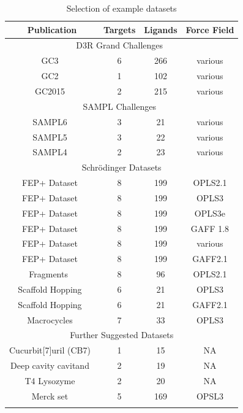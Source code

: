 \documentclass[9pt,bestpractices,pubversion]{livecoms}
\begin{document}
\begin{table}
\caption{Selection of example datasets}
\begin{tabular}{cccc}
\textbf{Publication} & \textbf{Targets} & \textbf{Ligands} & \textbf{Force Field} \\
\hline
\multicolumn{4}{|c|}{D3R Grand Challenges~\cite{D3R}} \\
\hline
GC3~\cite{gaieb2019d3r} & 6 & 266 & various \\
GC2~\cite{gaieb2018d3r} & 1 & 102 & various \\
GC2015~\cite{gathiaka2016d3r} & 2 & 215 & various \\
\hline
\multicolumn{4}{|c|}{SAMPL Challenges~\cite{SAMPL}} \\
\hline
SAMPL6~\cite{rizzi2018overview} & 3 & 21 & various \\
SAMPL5~\cite{yin2017overview} & 3 & 22 & various \\
SAMPL4~\cite{muddana2014sampl4} & 2 & 23 & various \\
\hline
\multicolumn{4}{|c|}{Schrödinger Datasets} \\
\hline
FEP+ Dataset~\cite{wang2015accurate} & 8 & 199 & OPLS2.1 \\
FEP+ Dataset~\cite{harder2016opls3} & 8 & 199 & OPLS3 \\
FEP+ Dataset~\cite{roos2019opls3e} & 8 & 199 & OPLS3e \\
FEP+ Dataset~\cite{song2019using} & 8 & 199 & GAFF 1.8 \\
FEP+ Dataset~\cite{gapsys2020large} & 8 & 199 & various \\
FEP+ Dataset~\cite{kuhn2020assessment} & 8 & 199 & GAFF2.1 \\
Fragments ~\cite{steinbrecher2015accurate} & 8 & 96 & OPLS2.1 \\
Scaffold Hopping~\cite{wang2017accurate} & 6 & 21 & OPLS3 \\
Scaffold Hopping~\cite{kuhn2020assessment} & 6 & 21 & GAFF2.1 \\
Macrocycles~\cite{yu2017accurate} & 7 & 33 & OPLS3 \\
\hline
\multicolumn{4}{|c|}{Further Suggested Datasets} \\
\hline
Cucurbit[7]uril (CB7)~\cite{mobley2017predicting} & 1 & 15 & NA \\
Deep cavity cavitand~\cite{mobley2017predicting} & 2 & 19 & NA \\
T4 Lysozyme~\cite{mobley2017predicting} & 2 & 20 & NA \\
Merck set~\cite{MCompChem2019Sep} & 5 & 169 & OPSL3 \\

\hline
\label{tab:benchmarks}
\end{tabular}
\end{table}
\end{document}

